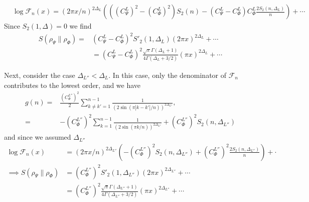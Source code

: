 \documentclass[11pt]{article}
\newcommand{\nn}{\nonumber}
\newcommand{\lb}{\left(}
\newcommand{\rb}{\right)}
\newcommand{\JM}[1]{\textcolor{orange}{#1}}
\begin{document}
\begin{align}
  &\log\mathcal{F}_n(x)=(2\pi x/n)^{2\Delta_L}\lb\lb{(C_\Psi^L)}^2-{(C_\Phi^L)}^2\rb S_2(n)-(C_\Psi^L-C_\Phi^L)C_\Phi^L \frac{2S_2(n,\Delta_L)}{n}\rb+\cdots
\end{align}
Since $S_2(1,\Delta)=0$ we find
\begin{align}
S(\rho_\Psi\|\rho_\Phi)
=&
(C_\Psi^L-C_\Phi^L)^2 S'_2(1,\Delta_L)(2\pi x)^{2\Delta_L}+\cdots \nn\\
&=(C_\Psi^L-C_\Phi^L)^2\frac{\sqrt{\pi}\Gamma(\Delta_{L}+1)}{4\Gamma(\Delta_{L}+3/2)}(\pi x)^{2\Delta_L}+\cdots
\end{align}

Next, consider the case $\Delta_{L''}<\Delta_L$. In this case, only the denominator of $\mathcal{F}_n$ contributes to the lowest order, and we have
  \begin{align}\label{gnw1p}
    g(n)= & \frac{{(C_\Phi^{L''})}^{2}}{2}\sum_{k\neq k'=1}^{n-1}\frac{1}{(2\sin(\pi |k-k'|/n))^{2\Delta_{L''}}}, \nn\\%
    =&-{(C_\Phi^{L''})}^{2}\sum_{k=1}^{n-1}\frac{1}{(2\sin(\pi k/n))^{2\Delta_{L''}}}+{(C_\Phi^{L''})}^{2} S_2(n,\Delta_{L''})
  \end{align}
and since we assumed $\Delta_{L''}$
\begin{align}
  \log\mathcal{F}_n(x)&=(2\pi x/n)^{2\Delta_{L''}}\lb -{(C_\Phi^{L''})}^{2} S_2(n,\Delta_{L''})+{(C_\Phi^{L''})}^{2} \frac{2S_2(n,\Delta_{L''})}{n}\rb+\cdot\nn\\
\implies S(\rho_\Psi\|\rho_\Phi)
&=
{(C_\Phi^{L''})}^{2} S'_2(1,\Delta_{L''})(2\pi x)^{2\Delta_{L''}}+\cdots \nn\\
&={(C_\Phi^{L''})}^{2}\frac{\sqrt{\pi}\Gamma(\Delta_{L''}+1)}{4\Gamma(\Delta_{L''}+3/2)}(\pi x)^{2\Delta_{L''}}+\cdots
\end{align}
\end{document}
